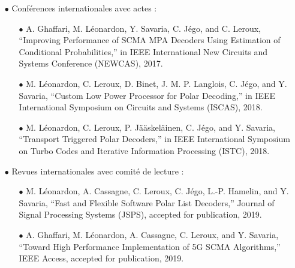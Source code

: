 \begin{itemize}
	\item[$\bullet$] Conférences internationales avec actes :
	\begin{itemize}
		\item[$\bullet$] A. Ghaffari, M. Léonardon, Y. Savaria, C. Jégo, and C. Leroux, “Improving Performance of SCMA MPA Decoders Using Estimation of Conditional Probabilities,” in IEEE International New Circuits and Systems Conference (NEWCAS), 2017.
		\item[$\bullet$] M. Léonardon, C. Leroux, D. Binet, J. M. P. Langlois, C. Jégo, and Y. Savaria, “Custom Low Power Processor for Polar Decoding,” in IEEE International Symposium on Circuits and Systems (ISCAS), 2018.
		\item[$\bullet$] M. Léonardon, C. Leroux, P. Jääskeläinen, C. Jégo, and Y. Savaria, “Transport Triggered Polar Decoders,” in IEEE International Symposium on Turbo Codes and Iterative Information Processing (ISTC), 2018.
	\end{itemize}
	\item[$\bullet$] Revues internationales avec comité de lecture :
	\begin{itemize}
		\item[$\bullet$] M. Léonardon, A. Cassagne, C. Leroux, C. Jégo, L.-P. Hamelin, and Y. Savaria, “Fast and Flexible Software Polar List Decoders,” Journal of Signal Processing Systems (JSPS), accepted for publication, 2019.
        \item[$\bullet$] A. Ghaffari, M. Léonardon, A. Cassagne, C. Leroux, and Y. Savaria, “Toward High Performance Implementation of 5G SCMA Algorithms,” IEEE Access, accepted for publication, 2019.
	\end{itemize}
\end{itemize}

